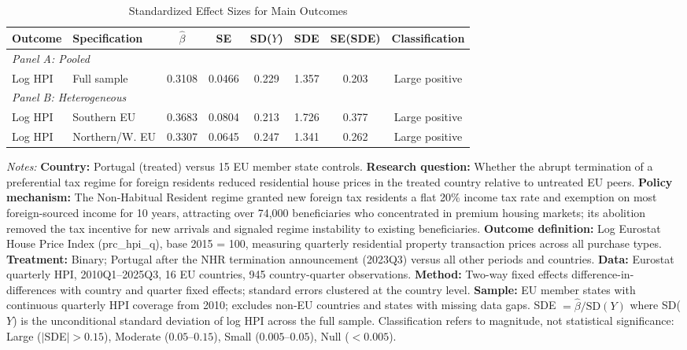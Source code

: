 \begin{table}[H]
\centering
\caption{Standardized Effect Sizes for Main Outcomes}
\label{tab:sde}
\begin{threeparttable}
\begin{tabular}{llcccccc}
\toprule
Outcome & Specification & $\hat{\beta}$ & SE & SD($Y$) & SDE & SE(SDE) & Classification \\
\midrule
\multicolumn{8}{l}{\textit{Panel A: Pooled}} \\
Log HPI & Full sample & 0.3108 & 0.0466 & 0.229 & 1.357 & 0.203 & Large positive \\
\midrule
\multicolumn{8}{l}{\textit{Panel B: Heterogeneous}} \\
Log HPI & Southern EU & 0.3683 & 0.0804 & 0.213 & 1.726 & 0.377 & Large positive \\
Log HPI & Northern/W. EU & 0.3307 & 0.0645 & 0.247 & 1.341 & 0.262 & Large positive \\
\bottomrule
\end{tabular}
\begin{tablenotes}[flushleft]
\small
\item \textit{Notes:} \textbf{Country:} Portugal (treated) versus 15 EU member state controls. \textbf{Research question:} Whether the abrupt termination of a preferential tax regime for foreign residents reduced residential house prices in the treated country relative to untreated EU peers. \textbf{Policy mechanism:} The Non-Habitual Resident regime granted new foreign tax residents a flat 20\% income tax rate and exemption on most foreign-sourced income for 10 years, attracting over 74,000 beneficiaries who concentrated in premium housing markets; its abolition removed the tax incentive for new arrivals and signaled regime instability to existing beneficiaries. \textbf{Outcome definition:} Log Eurostat House Price Index (prc\_hpi\_q), base 2015 = 100, measuring quarterly residential property transaction prices across all purchase types. \textbf{Treatment:} Binary; Portugal after the NHR termination announcement (2023Q3) versus all other periods and countries. \textbf{Data:} Eurostat quarterly HPI, 2010Q1--2025Q3, 16 EU countries, 945 country-quarter observations. \textbf{Method:} Two-way fixed effects difference-in-differences with country and quarter fixed effects; standard errors clustered at the country level. \textbf{Sample:} EU member states with continuous quarterly HPI coverage from 2010; excludes non-EU countries and states with missing data gaps. SDE $= \hat{\beta} / \text{SD}(Y)$ where SD($Y$) is the unconditional standard deviation of log HPI across the full sample. Classification refers to magnitude, not statistical significance: Large ($|$SDE$| > 0.15$), Moderate ($0.05$--$0.15$), Small ($0.005$--$0.05$), Null ($< 0.005$).
\end{tablenotes}
\end{threeparttable}
\end{table}

